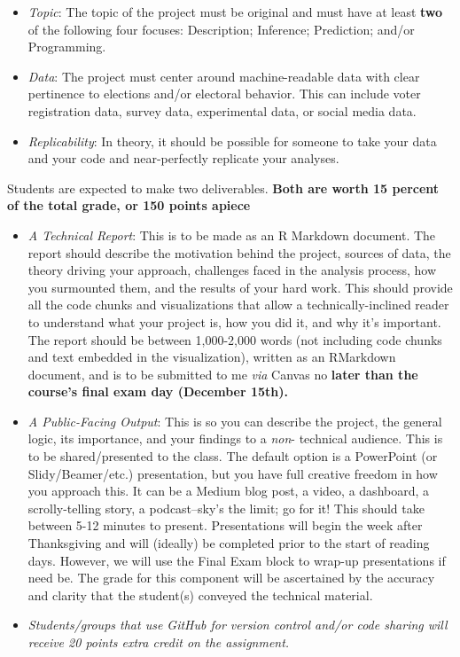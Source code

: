 \documentclass[11pt]{article}
\begin{document}
\begin{itemize}
\begin{itemize}
\item \textit{Topic}: The topic of the project must be original and must have at least \textbf{two} of the following four focuses: Description; Inference; Prediction; and/or Programming.
\item \textit{Data}: The project must center around machine-readable data with clear pertinence to elections and/or electoral behavior. This can include voter registration data, survey data, experimental data, or social media data. 
\item \textit{Replicability}: In theory, it should be possible for someone to take your data and your code and near-perfectly replicate your analyses.   
\end{itemize}

Students are expected to make two deliverables. \textbf{Both are worth 15 percent of the total grade, or 150 points apiece} 

\begin{itemize}
\item \textit{A Technical Report}: This is to be made as an R Markdown document. The report should describe the motivation behind the project, sources of data, the theory driving your approach, challenges faced in the analysis process, how you surmounted them, and the results of your hard work. This should provide all the code chunks and visualizations that allow a technically-inclined reader to understand what your project is, how you did it, and why it's important. The report should be between 1,000-2,000 words (not including code chunks and text embedded in the visualization), written as an RMarkdown document, and is to be submitted to me \textit{via} Canvas no \textbf{later than the course's final exam day (December 15th).}
\item \textit{A Public-Facing Output}: This is so you can describe the project, the general logic, its importance, and your findings to a \textit{non}- technical audience. This is to be shared/presented to the class. The default option is a PowerPoint (or Slidy/Beamer/etc.) presentation, but you have full creative freedom in how you approach this. It can be a Medium blog post, a video, a dashboard, a scrolly-telling story, a podcast--sky's the limit; go for it! This should take between 5-12 minutes to present. Presentations will begin the week after Thanksgiving and will (ideally) be completed prior to the start of reading days. However, we will use the Final Exam block to wrap-up presentations if need be. The grade for this component will be ascertained by the accuracy and clarity that the student(s) conveyed the technical material.
\item \textit{Students/groups that use GitHub for version control and/or code sharing will receive 20 points extra credit on the assignment.}
\end{itemize} 


\end{itemize}
\end{document}
